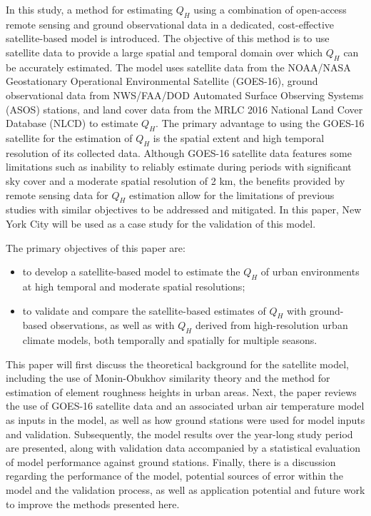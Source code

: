 In this study, a method for estimating $Q_H$ using a combination of open-access remote sensing and ground observational data in a dedicated, cost-effective satellite-based model is introduced. The objective of this method is to use satellite data to provide a large spatial and temporal domain over which $Q_H$ can be accurately estimated. The model uses satellite data from the NOAA/NASA Geostationary Operational Environmental Satellite (GOES-16), ground observational data from NWS/FAA/DOD Automated Surface Observing Systems (ASOS) stations, and land cover data from the MRLC 2016 National Land Cover Database (NLCD) to estimate $Q_H$. 
The primary advantage to using the GOES-16 satellite for the estimation of $Q_H$ is the spatial extent and high temporal resolution of its collected data. Although GOES-16 satellite data features some limitations such as inability to reliably estimate during periods with significant sky cover and a moderate spatial resolution of 2 km, the benefits provided by remote sensing data for $Q_H$ estimation allow for the limitations of previous studies with similar objectives to be addressed and mitigated. In this paper, New York City will be used as a case study for the validation of this model.

The primary objectives of this paper are:
\begin{itemize}
    \item to develop a satellite-based model to estimate the $Q_H$ of urban environments at high temporal and moderate spatial resolutions;
    \item to validate and compare the satellite-based estimates of $Q_H$ with ground-based observations, as well as with $Q_H$ derived from high-resolution urban climate models, both temporally and spatially for multiple seasons.
\end{itemize}

This paper will first discuss the theoretical background for the satellite model, including the use of Monin-Obukhov similarity theory \citep{Monin_1954} and the method for estimation of element roughness heights in urban areas. Next, the paper reviews the use of GOES-16 satellite data and an associated urban air temperature model \citep{Hrisko_2020} as inputs in the model, as well as how ground stations were used for model inputs and validation. Subsequently, the model results over the year-long study period are presented, along with validation data accompanied by a statistical evaluation of model performance against ground stations. Finally, there is a discussion regarding the performance of the model, potential sources of error within the model and the validation process, as well as application potential and future work to improve the methods presented here.

